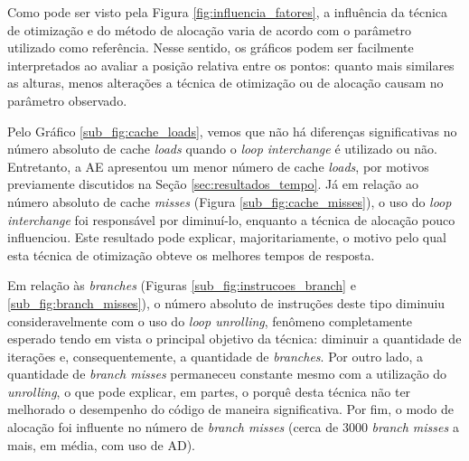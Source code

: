\documentclass[12pt,a4paper]{article}
\begin{document}
Como pode ser visto pela Figura \ref{fig:influencia_fatores}, a influência da técnica de otimização e do método de alocação varia de acordo com o parâmetro utilizado como referência. Nesse sentido, os gráficos podem ser facilmente interpretados ao avaliar a posição relativa entre os pontos: quanto mais similares as alturas, menos alterações a técnica de otimização ou de alocação causam no parâmetro observado.  


Pelo Gráfico \ref{sub_fig:cache_loads}, vemos que não há diferenças significativas no número absoluto de cache \textit{loads} quando o \textit{loop interchange} é utilizado ou não. Entretanto, a AE apresentou um menor número de cache \textit{loads}, por motivos previamente discutidos na Seção \ref{sec:resultados_tempo}. Já em relação ao número absoluto de cache \textit{misses} (Figura \ref{sub_fig:cache_misses}), o uso do \textit{loop interchange} foi responsável por diminuí-lo, enquanto a técnica de alocação pouco influenciou. Este resultado pode explicar, majoritariamente, o motivo pelo qual esta técnica de otimização obteve os melhores tempos de resposta.


Em relação às \textit{branches} (Figuras \ref{sub_fig:instrucoes_branch} e \ref{sub_fig:branch_misses}), o número absoluto de instruções deste tipo diminuiu consideravelmente com o uso do \textit{loop unrolling}, fenômeno completamente esperado tendo em vista o principal objetivo da técnica: diminuir a quantidade de iterações e, consequentemente, a quantidade de \textit{branches}. Por outro lado, a quantidade de \textit{branch misses} permaneceu constante mesmo com a utilização do \textit{unrolling}, o que pode explicar, em partes, o porquê desta técnica não ter melhorado o desempenho do código de maneira significativa. Por fim, o modo de alocação foi influente no número de \textit{branch misses} (cerca de $3000$ \textit{branch misses} a mais, em média, com uso de AD). 
\end{document}
